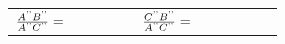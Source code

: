 {\begin{tabular}[t]{|l|l|l|}
    
        
                \begin{math}\frac{{A}^{\text{'}\text{'}}{B}^{\text{'}\text{'}}}{{A}^{\text{'}\text{'}}{C}^{\text{'}\text{'}}}=\phantom{\rule{42.67912pt}{0ex}}\end{math}
               &
    
    
        
                \begin{math}\frac{{C}^{\text{'}\text{'}}{B}^{\text{'}\text{'}}}{{A}^{\text{'}\text{'}}{C}^{\text{'}\text{'}}}=\phantom{\rule{42.67912pt}{0ex}}\end{math}
     \tabularnewline\cline{1-1}\cline{2-2}\cline{3-3}
    \end{tabular}} %
        \addtolength{\mytableboxheight}{\mytableboxdepth}
        \addtocounter{footnote}{-0}
        
